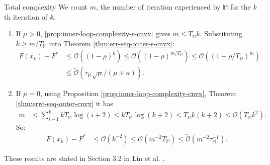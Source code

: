 \documentclass[11pt]{beamer}
\theoremstyle{definition}
\begin{document}
        \begin{frame}{Total complexity}
            We count $m$, the number of iteration experienced by $\mathbb M$ for the $k$ th iteration of $\mathbb A$. 
            \begin{enumerate}
                \item If $\mu > 0$, \ref{prop:inner-loop-complexity-s-cnvx} gives $m \le T_{\mathbb M}k$. 
                Substituting $k \ge m/T_{\mathbb M}$ into Theorem \ref{thm:err-seq-outer-s-cnvx}: 
                {\footnotesize
                \begin{align*}
                    F(x_k) - F^* &\le \mathcal O \left(
                        (1 - \rho)^k 
                    \right) \le 
                    \mathcal O \left(
                        (1 - \rho)^{m/ T_{\mathbb M}}
                    \right) \le 
                    \mathcal O\left(
                        \left(1 - \rho/T_{\mathbb M}\right)^{m}
                    \right)
                    \\
                    &\le \widetilde{\mathcal O}\left(
                        \tau_{\mathbb M}\sqrt{\mu}/(\mu + \kappa)
                    \right). 
                \end{align*}
                }
                \item If $\mu = 0$, using Proposition \ref{prop:inner-loop-complexity-cnvx}, Theorem \ref{thm:erro-seq-outer-cnvx} it has 
                {\footnotesize
                \begin{align*}
                    m &\le \sum_{i - 1}^{k} k T_{\mathbb M} \log(i + 2) \le k T_{\mathbb M} \log(k + 2) 
                    \le T_{\mathbb M}k(k + 2) 
                    \le 
                    \mathcal O(T_{\mathbb M} k^2). 
                \end{align*}
                So: 
                \begin{align*}
                    F(x_k)- F^* &\le 
                    \mathcal O(k^{-2})\le 
                    \mathcal O
                        \left(
                            m^{-2}T_{\mathbb M}
                        \right) 
                        \le \widetilde{\mathcal O}
                            \left(m^{-2}\tau_{\mathbb M}^{-1}\right). 
                \end{align*}
                }
            \end{enumerate}
            These results are stated in Section 3.2 in Lin et al. \cite{lin_universal_2015}. 
        \end{frame}
\end{document}
